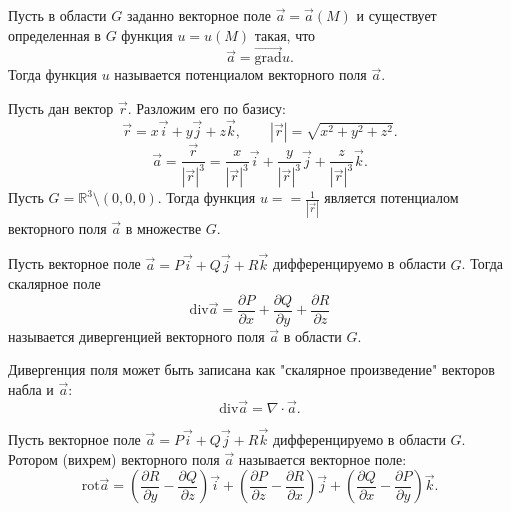 \begin{definition}
    Пусть в области $ G $ заданно векторное поле $ \vec{a} = \vec{a}(M) $ и существует определенная в $ G $ функция $ u = u(M) $
    такая, что
    \begin{equation} \nonumber
        \vec{a} = \vec{\text{grad}}u.
    \end{equation}
    Тогда функция $ u $ называется потенциалом векторного поля $ \vec{a} $.
\end{definition}

\begin{example}
    Пусть дан вектор $ \vec{r} $. Разложим его по базису:
    \begin{equation} \nonumber
        \vec{r} = x \vec{i} + y \vec{j} + z \vec{k}, \qquad |\vec{r}| = \sqrt{x^{2} + y^{2} + z^{2}}.
    \end{equation}
    \begin{equation} \nonumber
        \vec{a} = \frac{\vec{r}}{|\vec{r}|^{3}} = \frac{x}{|\vec{r}|^{3}} \vec{i} + \frac{y}{|\vec{r}|^{3}} \vec{j} +
        \frac{z}{|\vec{r}|^{3}} \vec{k}.
    \end{equation}
    Пусть $ G = \mathbb{R}^{3} \setminus (0,0,0) $. Тогда функция $ u = =\frac{1}{|\vec{r}|} $ является потенциалом
    векторного поля $ \vec{a} $ в множестве $ G $.
\end{example}

\begin{definition}
    Пусть векторное поле $ \vec{a} = P\vec{i} + Q\vec{j} + R\vec{k} $ дифференцируемо в области $ G $. Тогда скалярное поле
    \begin{equation} \nonumber
        \text{div}\vec{a} = \frac{\partial P}{\partial x} + \frac{\partial Q}{\partial y} + \frac{\partial R}{\partial z}
    \end{equation}
    называется дивергенцией векторного поля $ \vec{a} $ в области $ G $.
\end{definition}

\begin{remark}
    Дивергенция поля может быть записана как "скалярное произведение" векторов набла и $ \vec{a} $:
    \begin{equation} \nonumber
        \text{div}\vec{a} = \nabla \cdot \vec{a}.
    \end{equation}
\end{remark}

\begin{definition}
    Пусть векторное поле $ \vec{a} = P\vec{i} + Q\vec{j} + R\vec{k} $ дифференцируемо в области $ G $. Ротором (вихрем) векторного
    поля $ \vec{a} $ называется векторное поле:
    \begin{equation} \nonumber
        \text{rot}\vec{a} = \left(\frac{\partial R}{\partial y} - \frac{\partial Q}{\partial z}\right)\vec{i} + \left(\frac{\partial P}{\partial z} - \frac{\partial R}{\partial x}\right) \vec{j} + \left(\frac{\partial Q} {\partial x} - \frac{\partial P}{\partial y}\right)\vec{k}.
    \end{equation}
\end{definition}

